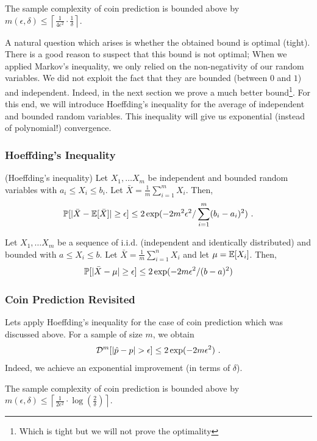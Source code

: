 \documentclass[11pt]{article}
\begin{document}
\begin{corollary}  \label{cor:basicConcentration}
The sample complexity of coin prediction is bounded above by
$m(\epsilon,\delta) \le \left \lceil \frac{1}{4\epsilon^2} \cdot
  \frac{1}{\delta} \right \rceil$.
\end{corollary}

A natural question which arises is whether the obtained bound is optimal (tight). There is a good reason to suspect that this bound is not optimal; When we applied Markov's inequality, we only relied on the non-negativity of our random variables. We did not exploit the fact that they are bounded (between $0$ and $1$) and independent. Indeed, in the next section we prove a much better bound\footnote{Which is tight but we will not prove the optimality}. For this end, we will introduce Hoeffding's inequality for the average of independent and bounded random variables. This inequality will give us exponential (instead of polynomial!) convergence. 
\subsubsection{Hoeffding's Inequality}
\begin{theorem} (Hoeffding's inequality)
Let $X_1, \ldots X_m$ be independent and bounded random variables with $a_i \leq X_i \leq b_i$. Let $\bar{X} = \frac{1}{m} \sum_{i=1} ^m X_i$. Then,
\[
\operatorname*{\mathbb{P}} [ |\bar{X} - \mathbb{E}[\bar{X}]| \geq \epsilon ] \leq 2 \exp(-2m^2 \epsilon^2 / \sum _{i =1} ^m (b_i-a_i)^2)~.
\]
\end{theorem}
\begin{corollary}
Let $X_1, \ldots X_m$ be a sequence of i.i.d. (independent and identically distributed) and bounded with $a \leq X_i \leq b$. Let $\bar{X} = \frac{1}{m} \sum_{i=1} ^n X_i$ and let $\mu = \mathbb{E}[X_i]$. Then,
\[
\operatorname*{\mathbb{P}} [|\bar{X} - \mu| \geq \epsilon] \leq 2 \exp(-2 m \epsilon^2 / (b-a)^2) 
\]
\end{corollary}

\subsubsection{Coin Prediction Revisited}
Lets apply Hoeffding's inequality for the case of coin prediction which was discussed above. For a sample of size $m$, we obtain 
\[
\cD^m [|\hat{p}-p|>\epsilon ]\leq  2 \exp(-2 m \epsilon ^2)~.
\]
Indeed, we achieve an exponential improvement (in terms of $\delta$).  
\begin{corollary}  \label{cor:basicConcentration}
The sample complexity of coin prediction is bounded above by
$m(\epsilon,\delta) \le \left \lceil \frac{1}{2\epsilon^2} \cdot
  \log(\frac{2}{\delta}) \right \rceil$.
\end{corollary}
\end{document}
